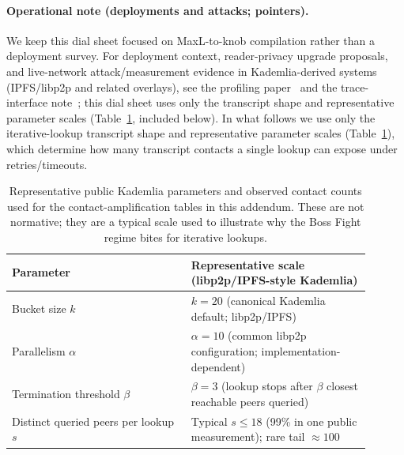 \documentclass[11pt]{article}
\begin{document}
\paragraph{Operational note (deployments and attacks; pointers).}
We keep this dial sheet focused on MaxL-to-knob compilation rather than a deployment survey.
For deployment context, reader-privacy upgrade proposals, and live-network attack/measurement evidence in Kademlia-derived systems (IPFS/libp2p and related overlays), see the profiling paper~\cite{series:profiling} and the trace-interface note~\cite{series:traceifaces}; this dial sheet uses only the transcript shape and representative parameter scales (Table~\ref{tab:ipfs-kad-params}, included below).
In what follows we use only the iterative-lookup transcript shape and representative parameter scales (Table~\ref{tab:ipfs-kad-params}), which determine how many transcript contacts a single lookup can expose under retries/timeouts.

\begin{table}[t]
\centering
\begin{tabular}{@{}p{0.45\linewidth}p{0.45\linewidth}@{}}
\toprule
Parameter & Representative scale (libp2p/IPFS-style Kademlia) \\
\midrule
Bucket size $k$ & $k=20$ (canonical Kademlia default; libp2p/IPFS) \\
Parallelism $\alpha$ & $\alpha=10$ (common libp2p configuration; implementation-dependent) \\
Termination threshold $\beta$ & $\beta=3$ (lookup stops after $\beta$ closest reachable peers queried) \\
Distinct queried peers per lookup $s$ & Typical $s\le 18$ (99\% in one public measurement); rare tail $\approx 100$ \\
\bottomrule
\end{tabular}
\caption{Representative public Kademlia parameters and observed contact counts used for the contact-amplification tables in this addendum. These are not normative; they are a typical scale used to illustrate why the Boss Fight regime bites for iterative lookups.}
\label{tab:ipfs-kad-params}
\end{table}
\end{document}
